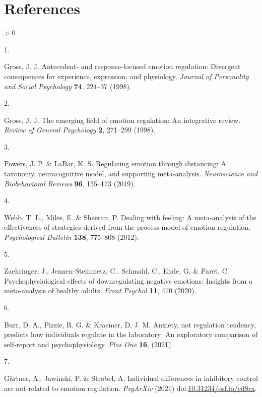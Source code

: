 \documentclass[
  english,
  man,floatsintext]{apa6}
\newlength{\cslhangindent}
\newlength{\csllabelwidth}
\newenvironment{CSLReferences}[2] %
 {%
  \setlength{\parindent}{0pt}
  \ifodd #1 \everypar{\setlength{\hangindent}{\cslhangindent}}\ignorespaces\fi
  \ifnum #2 > 0
  \setlength{\parskip}{#2\baselineskip}
  \fi
 }%
 {}
\newcommand{\CSLLeftMargin}[1]{\parbox[t]{\csllabelwidth}{#1}}
\newcommand{\CSLRightInline}[1]{\parbox[t]{\linewidth - \csllabelwidth}{#1}\break}
\begin{document}
\hypertarget{references}{%
\section{References}\label{references}}

\begingroup
\setlength{\parindent}{-0.5in}
\setlength{\leftskip}{0.5in}

\hypertarget{refs}{}
\begin{CSLReferences}{0}{0}
\leavevmode\hypertarget{ref-Gross1998antecedent}{}%
\CSLLeftMargin{1. }
\CSLRightInline{Gross, J. J. Antecedent- and response-focused emotion regulation: Divergent consequences for experience, expression, and physiology. \emph{Journal of Personality and Social Psychology} \textbf{74}, 224--37 (1998).}

\leavevmode\hypertarget{ref-Gross1998emerging}{}%
\CSLLeftMargin{2. }
\CSLRightInline{Gross, J. J. The emerging field of emotion regulation: An integrative review. \emph{Review of General Psychology} \textbf{2}, 271--299 (1998).}

\leavevmode\hypertarget{ref-Powers2019}{}%
\CSLLeftMargin{3. }
\CSLRightInline{Powers, J. P. \& LaBar, K. S. Regulating emotion through distancing: A taxonomy, neurocognitive model, and supporting meta-analysis. \emph{Neuroscience and Biobehavioral Reviews} \textbf{96}, 155--173 (2019).}

\leavevmode\hypertarget{ref-Webb2012}{}%
\CSLLeftMargin{4. }
\CSLRightInline{Webb, T. L., Miles, E. \& Sheeran, P. Dealing with feeling: A meta-analysis of the effectiveness of strategies derived from the process model of emotion regulation. \emph{Psychological Bulletin} \textbf{138}, 775--808 (2012).}

\leavevmode\hypertarget{ref-Zaehringer2020}{}%
\CSLLeftMargin{5. }
\CSLRightInline{Zaehringer, J., Jennen-Steinmetz, C., Schmahl, C., Ende, G. \& Paret, C. Psychophysiological effects of downregulating negative emotions: Insights from a meta-analysis of healthy adults. \emph{Front Psychol} \textbf{11}, 470 (2020).}

\leavevmode\hypertarget{ref-Burr2021}{}%
\CSLLeftMargin{6. }
\CSLRightInline{Burr, D. A., Pizzie, R. G. \& Kraemer, D. J. M. Anxiety, not regulation tendency, predicts how individuals regulate in the laboratory: An exploratory comparison of self-report and psychophysiology. \emph{Plos One} \textbf{16}, (2021).}

\leavevmode\hypertarget{ref-Gaertner2021}{}%
\CSLLeftMargin{7. }
\CSLRightInline{Gärtner, A., Jawinski, P. \& Strobel, A. Individual differences in inhibitory control are not related to emotion regulation. \emph{PsyArXiv} (2021) doi:\href{https://doi.org/10.31234/osf.io/cd8rx}{10.31234/osf.io/cd8rx}.}


\end{CSLReferences}
\end{document}

